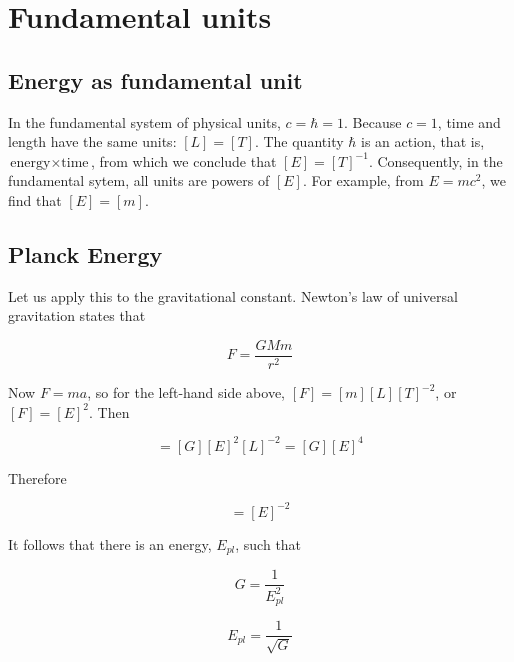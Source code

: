 

\section{Fundamental units}


\innertableofcontents

\subsection{Energy as fundamental unit}
In the fundamental system of  physical units, $c = \hbar = 1$. Because $c = 1$, time and length have the same units: $[L] = [T]$. The quantity $\hbar$ is
an action, that is, $\text{energy}\times \text{time}$, from which we conclude that $[E] = [T]^{-1}$.  Consequently, in the fundamental sytem, all units are powers of $[E]$.  For example, from $E = mc^2$, we find that $[E] = [m]$.
\medskip

\subsection{Planck Energy}

Let us apply this to the gravitational constant.  Newton's law of universal gravitation states that
\medskip

\begin{equation}
F = \frac{GMm}{r^2}
\end{equation}


Now $F  = ma$, so for the left-hand side above, $[F] = [m][L][T]^{-2}$, or $[F] = [E]^2$.  Then


\begin{equation}
[F] = [G][E]^2[L]^{-2} = [G][E]^4
\end{equation}


Therefore

\begin{equation}
[G] = [E]^{-2}
\end{equation}

It follows that there is an energy, $E_{pl}$, such that

\begin{equation}
G = \frac{1}{E_{pl}^2}
\end{equation}



\begin{equation}
E_{pl} = \frac{1}{\sqrt G}
\end{equation}


